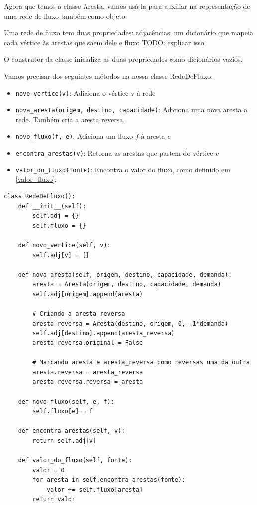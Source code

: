 \documentclass[11pt]{article}
\begin{document}
\begin{enumerate}
Agora que temos a classe Aresta, vamos usá-la para auxiliar na
representação de uma rede de fluxo também como objeto.

Uma rede de fluxo tem duas propriedades: adjacências, um dicionário
que mapeia cada vértice às arestas que saem dele e fluxo TODO: explicar isso

O construtor da classe inicializa as duas propriedades como dicionários vazios.

Vamos precisar dos seguintes métodos na nossa classe RedeDeFluxo:

\begin{itemize}
\item \verb~novo_vertice(v)~: Adiciona o vértice v à rede
\item \verb~nova_aresta(origem, destino, capacidade)~: Adiciona uma nova aresta a
rede. Também cria a aresta reversa.
\item \verb~novo_fluxo(f, e)~: Adiciona um fluxo $f$ à aresta $e$
\item \verb~encontra_arestas(v)~: Retorna as arestas que partem do vértice $v$
\item \verb~valor_do_fluxo(fonte)~: Encontra o valor do fluxo, como definido em \eqref{valor_fluxo}.
\end{itemize}

\begin{verbatim}
class RedeDeFluxo():
    def __init__(self):
        self.adj = {}
        self.fluxo = {}

    def novo_vertice(self, v):
        self.adj[v] = []

    def nova_aresta(self, origem, destino, capacidade, demanda):
        aresta = Aresta(origem, destino, capacidade, demanda)
        self.adj[origem].append(aresta)

        # Criando a aresta reversa
        aresta_reversa = Aresta(destino, origem, 0, -1*demanda)
        self.adj[destino].append(aresta_reversa)
        aresta_reversa.original = False

        # Marcando aresta e aresta_reversa como reversas uma da outra
        aresta.reversa = aresta_reversa
        aresta_reversa.reversa = aresta

    def novo_fluxo(self, e, f):
        self.fluxo[e] = f

    def encontra_arestas(self, v):
        return self.adj[v]

    def valor_do_fluxo(self, fonte):
        valor = 0
        for aresta in self.encontra_arestas(fonte):
            valor += self.fluxo[aresta]
        return valor
\end{verbatim}
\end{enumerate}
\end{document}

